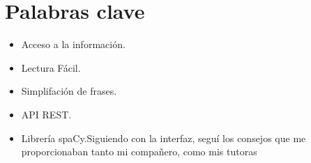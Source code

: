 \section*{Palabras clave}
   
   \begin{itemize}
   	\item Acceso a la información.
   	\item Lectura Fácil.
   	\item Simplifación de frases.
   	\item API REST.
   	\item Librería spaCy.Siguiendo con la interfaz, seguí los consejos que me proporcionaban tanto mi compañero, como mis tutoras 
   	
   \end{itemize}
   



